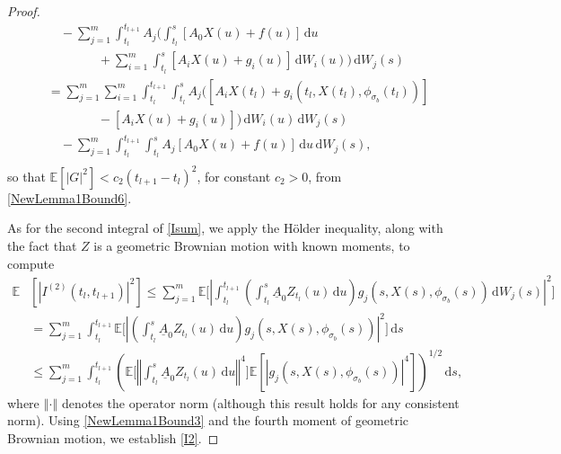 \documentclass[onefignum]{siamart250211}
\providecommand{\abs}[1]{\left|#1\right|}
\providecommand{\norm}[1]{\left\Vert#1\right\Vert}
\begin{document}
\begin{proof}
\begin{align*}
&\quad-\sum_{j=1}^m\int_{t_l}^{t_{l+1}}A_j\bigg(\int_{t_l}^s[A_0X(u)+f(u)]\,\mathrm{d}u\\
&\quad\quad\quad\quad+\sum_{i=1}^m\int_{t_l}^s[A_iX(u)+g_i(u)]\,\mathrm{d}W_i(u)\bigg)\,\mathrm{d}W_j(s)\\
&=\sum_{j=1}^m\sum_{i=1}^m\int_{t_l}^{t_{l+1}}\int_{t_l}^sA_j\bigg([A_iX(t_l)+g_i(t_l,X(t_l),\phi_{\sigma_b}(t_l))]\\
&\quad\quad\quad\quad-[A_iX(u)+g_i(u)]\bigg)\,\mathrm{d}W_i(u)\,\mathrm{d}W_j(s)\\
&\quad-\sum_{j=1}^m\int_{t_l}^{t_{l+1}}\int_{t_l}^sA_j[A_0X(u)+f(u)]\,\mathrm{d}u\,\mathrm{d}W_j(s),\\
\end{align*}
so that $\mathbb{E}[\abs{G}^2]<c_2(t_{l+1}-t_l)^2$, for constant $c_2>0$, from \cref{NewLemma1Bound6}.

As for the second integral of \cref{Isum}, we apply the H\"older inequality, along with the fact that $Z$ is a geometric Brownian motion with known moments, to compute
\begin{align*}
\mathbb{E}&\left[\abs{I^{(2)}(t_l,t_{l+1})}^2\right]\leqslant\sum_{j=1}^m\mathbb{E}\bigg[\abs{\int_{t_l}^{t_{l+1}}\left(\int_{t_l}^s\underline{A}_0Z_{t_l}(u)\,\mathrm{d}u\right)g_j(s,X(s),\phi_{\sigma_b}(s))\,\mathrm{d}W_j(s)}^2\bigg]\\
&=\sum_{j=1}^m\int_{t_l}^{t_{l+1}}\mathbb{E}\bigg[\abs{\left(\int_{t_l}^s\underline{A}_0Z_{t_l}(u)\,\mathrm{d}u\right)g_j(s,X(s),\phi_{\sigma_b}(s))}^2\bigg]\,\mathrm{d}s\\
&\leqslant\sum_{j=1}^m\int_{t_l}^{t_{l+1}}\left(\mathbb{E}\bigg[\norm{\int_{t_l}^s\underline{A}_0Z_{t_l}(u)\,\mathrm{d}u}^4\bigg]\mathbb{E}\left[\abs{g_j(s,X(s),\phi_{\sigma_b}(s))}^4\right]\right)^{1/2}\,\mathrm{d}s,
\end{align*}
where $\norm{\cdot}$ denotes the operator norm (although this result holds for any consistent norm). Using \cref{NewLemma1Bound3} and the fourth moment of geometric Brownian motion, we establish \cref{I2}.


\end{proof}
\end{document}
